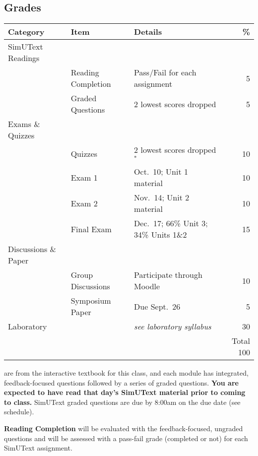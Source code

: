 \documentclass{tufte-handout}
\begin{document}
\begin{fullwidth}
\section{Grades}


\begin{table}
\begin{tabular}{l l l r}
Category & Item & Details & \% \\
\hline
SimUText Readings & \\
& Reading Completion & Pass/Fail for each assignment & 5 \\
& Graded Questions & 2 lowest scores dropped & 5 \\
\hline
Exams \& Quizzes \\
& Quizzes & 2 lowest scores dropped$^*$ & 10 \\
& Exam 1 & Oct.~10; Unit 1 material & 10 \\
& Exam 2 & Nov.~14; Unit 2 material & 10 \\
& Final Exam & Dec.~17; 66\% Unit 3; 34\% Units 1\&2 & 15 \\ 							%
\hline 
Discussions \& Paper \\
& Group Discussions & Participate through Moodle & 10 \\
 & Symposium Paper & Due Sept.~26 & 5 \\
\hline
Laboratory & & \emph{see laboratory syllabus} & 30 \\
\hline
& & & Total 100
\end{tabular}
\end{table}

\end{fullwidth}

 are from the interactive textbook for this class, and each module has integrated, feedback-focused questions followed by a series of graded questions. \textbf{You are expected to have read that day's SimUText material prior to coming to class. } SimUText graded questions are due by 8:00am on the due date (see schedule).

\textbf{Reading Completion} will be evaluated with the feedback-focused, ungraded questions and will be assessed with a pass-fail grade (completed or not) for each SimUText assignment. 
\end{document}
